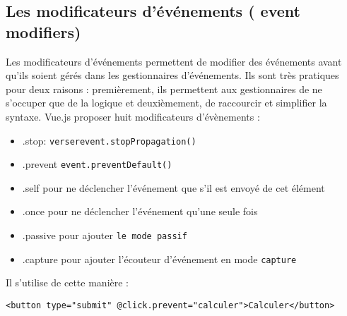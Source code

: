 \subsection{Les modificateurs d'événements ( {\color{monOrange}event modifiers})}
Les modificateurs d'événements permettent de modifier des événements avant qu'ils soient gérés dans les gestionnaires d'événements. Ils sont très pratiques pour deux raisons : premièrement, ils permettent aux gestionnaires de ne s'occuper que de la logique et deuxièmement, de raccourcir et simplifier la syntaxe. {\color{monOrange}Vue.js} proposer huit modificateurs d'évènements :
\begin{itemize}
\item {\color{blue} .stop}: {\tt verserevent.stopPropagation()}
\item {\color{blue} .prevent} {\tt  event.preventDefault()}
\item {\color{blue} .self} pour ne déclencher l'événement que s'il est envoyé de cet élément
\item {\color{blue} .once} pour ne déclencher l'événement qu'une seule fois
\item {\color{blue} .passive} pour ajouter {\tt le mode passif}
\item {\color{blue} .capture} pour ajouter l'écouteur d'événement en mode {\tt capture}
\end{itemize}
Il s'utilise de cette manière :
\begin{verbatim}
<button type="submit" @click.prevent="calculer">Calculer</button>
\end{verbatim}


